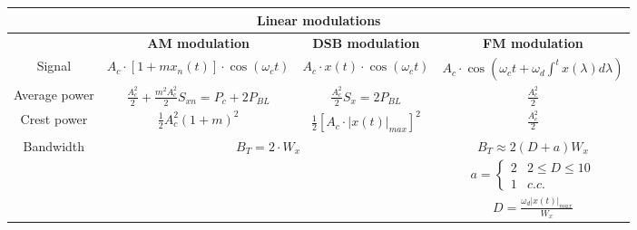 \documentclass[en]{article}
\begin{document}
\begin{center}
    \renewcommand{\arraystretch}{2}
    \begin{tabular}{|c|c|c|c|}
        \multicolumn{4}{c}{{\bf Linear modulations }} \\
        \hline
        & {\bf AM modulation } & {\bf DSB modulation } & {\bf FM modulation } \\
        \hline
        Signal & $A_c \cdot [1 + m x_n(t)] \cdot \cos(\omega_c t)$ & $A_c \cdot x(t) \cdot \cos(\omega_c t)$ & $A_c \cdot \cos \left ( \omega_c t + \omega_d \int^t x(\lambda) d\lambda \right )$\\
        \hline
        Average power & $\displaystyle\frac{A_c^2}{2} + \displaystyle\frac{m^2 A_c^2}{2} S_{xn} = P_c + 2P_{BL}$ & $\displaystyle\frac{A_c^2}{2}S_x = 2 P_{BL}$ & $\frac{A_c^2}{2}$ \\
        \hline
        Crest power & $\displaystyle\frac{1}{2} A_c^2 (1+m)^2$ & $\displaystyle\frac{1}{2} [A_c \cdot |x(t)|_{max}]^2$ & $\frac{A_c^2}{2}$\\
        \hline
        \multirow{3}{*}{Bandwidth} & \multicolumn{2}{c|}{$B_T = 2 \cdot W_x$} & $B_T \approx 2 (D+a) W_x$\\
        & \multicolumn{2}{c|}{} & $a = \left \{ \begin{array}{lc} 2 & 2 \leq D \leq 10 \\ 1 & c.c. \end{array} \right. $ \\
        & \multicolumn{2}{c|}{} & $D = \frac{\omega_d |x(t)|_{max}}{W_x}$ \\
        \hline
    \end{tabular}

  



\end{center}
\end{document}
